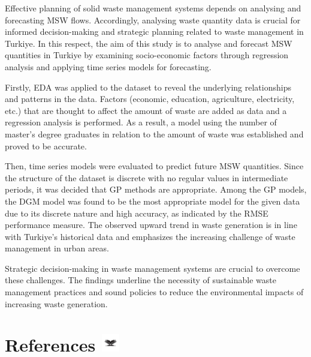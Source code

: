 \documentclass[
  11pt,
  a4paper,
  DIV=11,
  numbers=noendperiod]{scrartcl}
\begin{document}
Effective planning of solid waste management systems depends on
analysing and forecasting MSW flows. Accordingly, analysing waste
quantity data is crucial for informed decision-making and strategic
planning related to waste management in Turkiye. In this respect, the
aim of this study is to analyse and forecast MSW quantities in Turkiye
by examining socio-economic factors through regression analysis and
applying time series models for forecasting.

Firstly, EDA was applied to the dataset to reveal the underlying
relationships and patterns in the data. Factors (economic, education,
agriculture, electricity, etc.) that are thought to affect the amount of
waste are added as data and a regression analysis is performed. As a
result, a model using the number of master's degree graduates in
relation to the amount of waste was established and proved to be
accurate.

Then, time series models were evaluated to predict future MSW
quantities. Since the structure of the dataset is discrete with no
regular values in intermediate periods, it was decided that GP methods
are appropriate. Among the GP models, the DGM model was found to be the
most appropriate model for the given data due to its discrete nature and
high accuracy, as indicated by the RMSE performance measure. The
observed upward trend in waste generation is in line with Turkiye's
historical data and emphasizes the increasing challenge of waste
management in urban areas.

Strategic decision-making in waste management systems are crucial to
overcome these challenges. The findings underline the necessity of
sustainable waste management practices and sound policies to reduce the
environmental impacts of increasing waste generation.

\section[{References} ]{\texorpdfstring{{References}
\protect\includegraphics[width=0.3125in,height=0.30208in]{assets/images/references.jpg}}{References }}\label{references}
\end{document}
